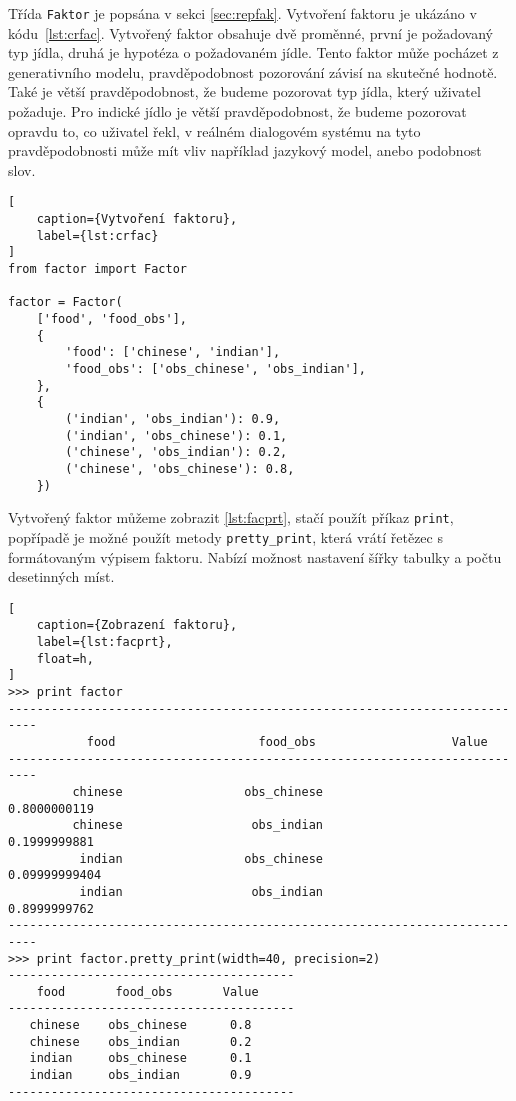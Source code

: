 Třída \texttt{Faktor} je popsána v sekci \ref{sec:repfak}.
Vytvoření faktoru je ukázáno v kódu~\ref{lst:crfac}.
Vytvořený faktor obsahuje dvě proměnné, první je požadovaný typ jídla, druhá je hypotéza o požadovaném jídle.
Tento faktor může pocházet z generativního modelu, pravděpodobnost pozorování závisí na skutečné hodnotě.
Také je větší pravděpodobnost, že budeme pozorovat typ jídla, který uživatel požaduje.
Pro indické jídlo je větší pravděpodobnost, že budeme pozorovat opravdu to, co uživatel řekl, v reálném dialogovém systému na tyto pravděpodobnosti může mít vliv například jazykový model, anebo podobnost slov.

\begin{lstlisting}[
	caption={Vytvoření faktoru},
	label={lst:crfac}
]
from factor import Factor

factor = Factor(
    ['food', 'food_obs'],
    {
        'food': ['chinese', 'indian'],
        'food_obs': ['obs_chinese', 'obs_indian'],
    },
    {
		('indian', 'obs_indian'): 0.9,
		('indian', 'obs_chinese'): 0.1,
		('chinese', 'obs_indian'): 0.2,
		('chinese', 'obs_chinese'): 0.8,
    })
\end{lstlisting}

Vytvořený faktor můžeme zobrazit \ref{lst:facprt}, stačí použít příkaz \texttt{print}, popřípadě je možné použít metody \texttt{pretty\_print}, která vrátí řetězec s formátovaným výpisem faktoru.
Nabízí možnost nastavení šířky tabulky a počtu desetinných míst.

\begin{lstlisting}[
	caption={Zobrazení faktoru},
	label={lst:facprt},
	float=h,
]
>>> print factor
--------------------------------------------------------------------------
           food                    food_obs                   Value
--------------------------------------------------------------------------
         chinese                 obs_chinese               0.8000000119
         chinese                  obs_indian               0.1999999881
          indian                 obs_chinese              0.09999999404
          indian                  obs_indian               0.8999999762
--------------------------------------------------------------------------
>>> print factor.pretty_print(width=40, precision=2)
----------------------------------------
    food       food_obs       Value
----------------------------------------
   chinese    obs_chinese      0.8
   chinese    obs_indian       0.2
   indian     obs_chinese      0.1
   indian     obs_indian       0.9
----------------------------------------
\end{lstlisting}

